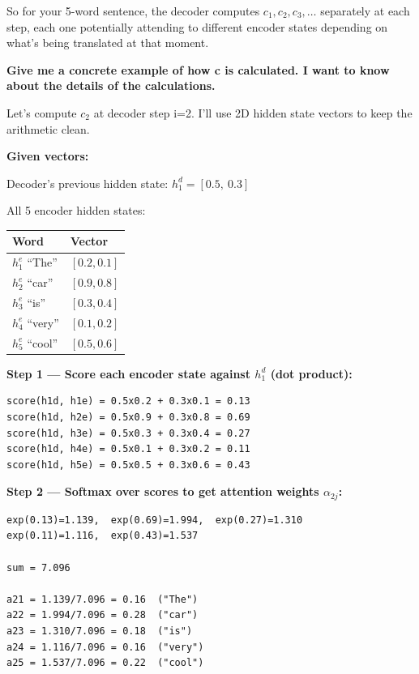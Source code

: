 So for your 5-word sentence, the decoder computes $c_1, c_2, c_3, \ldots$ separately at each step, each one potentially attending to different encoder states depending on what's being translated at that moment.

\bigskip

\textbf{Give me a concrete example of how c is calculated. I want to know about the details of the calculations.}

Let's compute $c_2$ at decoder step i=2. I'll use 2D hidden state vectors to keep the arithmetic clean.

\medskip
\textbf{Given vectors:}

Decoder's previous hidden state: $h_1^d = [0.5,\ 0.3]$

All 5 encoder hidden states:

\begin{center}
\begin{tabular}{ll}
\hline
Word & Vector \\
\hline
$h_1^e$ ``The'' & $[0.2, 0.1]$ \\
$h_2^e$ ``car'' & $[0.9, 0.8]$ \\
$h_3^e$ ``is''  & $[0.3, 0.4]$ \\
$h_4^e$ ``very''& $[0.1, 0.2]$ \\
$h_5^e$ ``cool''& $[0.5, 0.6]$ \\
\hline
\end{tabular}
\end{center}

\textbf{Step 1 --- Score each encoder state against $h_1^d$ (dot product):}

\begin{verbatim}
score(h1d, h1e) = 0.5x0.2 + 0.3x0.1 = 0.13
score(h1d, h2e) = 0.5x0.9 + 0.3x0.8 = 0.69
score(h1d, h3e) = 0.5x0.3 + 0.3x0.4 = 0.27
score(h1d, h4e) = 0.5x0.1 + 0.3x0.2 = 0.11
score(h1d, h5e) = 0.5x0.5 + 0.3x0.6 = 0.43
\end{verbatim}

\textbf{Step 2 --- Softmax over scores to get attention weights $\alpha_{2j}$:}

\begin{verbatim}
exp(0.13)=1.139,  exp(0.69)=1.994,  exp(0.27)=1.310
exp(0.11)=1.116,  exp(0.43)=1.537

sum = 7.096

a21 = 1.139/7.096 = 0.16  ("The")
a22 = 1.994/7.096 = 0.28  ("car")
a23 = 1.310/7.096 = 0.18  ("is")
a24 = 1.116/7.096 = 0.16  ("very")
a25 = 1.537/7.096 = 0.22  ("cool")
\end{verbatim}

